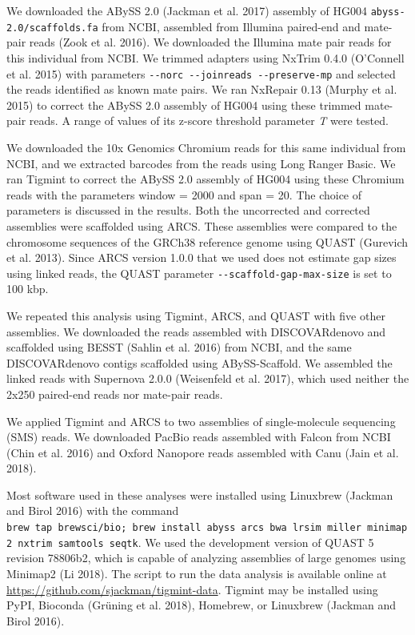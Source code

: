 \documentclass[
  12pt,
  oneside,
  openany]{book}
\begin{document}
We downloaded the ABySS 2.0 (Jackman et al. 2017) assembly of HG004 \texttt{abyss-2.0/scaffolds.fa} from NCBI, assembled from Illumina paired-end and mate-pair reads (Zook et al. 2016). We downloaded the Illumina mate pair reads for this individual from NCBI. We trimmed adapters using NxTrim 0.4.0 (O'Connell et al. 2015) with parameters \texttt{-\/-norc\ -\/-joinreads\ -\/-preserve-mp} and selected the reads identified as known mate pairs. We ran NxRepair 0.13 (Murphy et al. 2015) to correct the ABySS 2.0 assembly of HG004 using these trimmed mate-pair reads. A range of values of its z-score threshold parameter \emph{T} were tested.

We downloaded the 10x Genomics Chromium reads for this same individual from NCBI, and we extracted barcodes from the reads using Long Ranger Basic. We ran Tigmint to correct the ABySS 2.0 assembly of HG004 using these Chromium reads with the parameters window = 2000 and span = 20. The choice of parameters is discussed in the results. Both the uncorrected and corrected assemblies were scaffolded using ARCS. These assemblies were compared to the chromosome sequences of the GRCh38 reference genome using QUAST (Gurevich et al. 2013). Since ARCS version 1.0.0 that we used does not estimate gap sizes using linked reads, the QUAST parameter \texttt{-\/-scaffold-gap-max-size} is set to 100 kbp.

We repeated this analysis using Tigmint, ARCS, and QUAST with five other assemblies. We downloaded the reads assembled with DISCOVARdenovo and scaffolded using BESST (Sahlin et al. 2016) from NCBI, and the same DISCOVARdenovo contigs scaffolded using ABySS-Scaffold. We assembled the linked reads with Supernova 2.0.0 (Weisenfeld et al. 2017), which used neither the 2x250 paired-end reads nor mate-pair reads.

We applied Tigmint and ARCS to two assemblies of single-molecule sequencing (SMS) reads. We downloaded PacBio reads assembled with Falcon from NCBI (Chin et al. 2016) and Oxford Nanopore reads assembled with Canu (Jain et al. 2018).

Most software used in these analyses were installed using Linuxbrew (Jackman and Birol 2016) with the command \texttt{brew\ tap\ brewsci/bio;\ brew\ install\ abyss\ arcs\ bwa\ lrsim\ miller\ minimap2\ nxtrim\ samtools\ seqtk}. We used the development version of QUAST 5 revision 78806b2, which is capable of analyzing assemblies of large genomes using Minimap2 (Li 2018). The script to run the data analysis is available online at \url{https://github.com/sjackman/tigmint-data}. Tigmint may be installed using PyPI, Bioconda (Grüning et al. 2018), Homebrew, or Linuxbrew (Jackman and Birol 2016).
\end{document}
